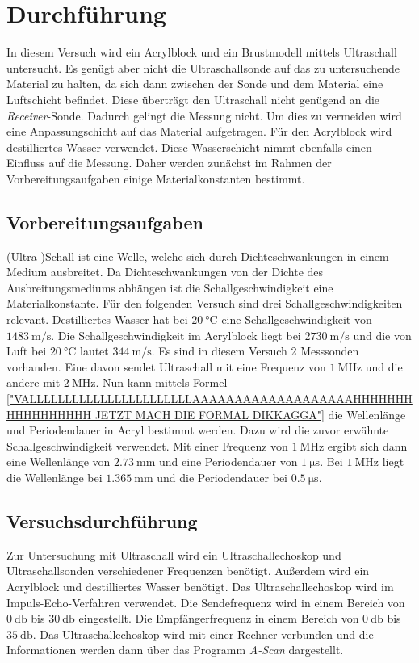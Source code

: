 \section{Durchführung}
\label{sec:Durchführung}
In diesem Versuch wird ein Acrylblock und ein Brustmodell mittels Ultraschall untersucht. Es genügt aber nicht die Ultraschallsonde auf das zu untersuchende Material zu halten, da sich dann
zwischen der Sonde und dem Material eine Luftschicht befindet. Diese überträgt den Ultraschall nicht genügend an die \textit{Receiver}-Sonde. Dadurch gelingt die Messung nicht. Um dies zu vermeiden
wird eine Anpassungschicht auf das Material aufgetragen. Für den Acrylblock wird destilliertes Wasser verwendet. Diese Wasserschicht nimmt ebenfalls einen Einfluss auf die Messung. Daher werden
zunächst im Rahmen der Vorbereitungsaufgaben einige Materialkonstanten bestimmt.
\subsection{Vorbereitungsaufgaben}
\label{subsec:VBA}
(Ultra-)Schall ist eine Welle, welche sich durch Dichteschwankungen in einem Medium ausbreitet. Da Dichteschwankungen von der Dichte des Ausbreitungsmediums abhängen ist die Schallgeschwindigkeit
eine  Materialkonstante. Für den folgenden Versuch sind drei Schallgeschwindigkeiten relevant. Destilliertes Wasser hat bei $\qty{20}{\celsius}$ eine Schallgeschwindigkeit von $\qty{1483}{\metre\per\second}$.
Die Schallgeschwindigkeit im Acrylblock liegt bei $\qty{2730}{\metre\per\second}$ und die von Luft bei $\qty{20}{\celsius}$ lautet $\qty{344}{\metre\per\second}$.
Es sind in diesem Versuch 2 Messsonden vorhanden. Eine davon sendet Ultraschall mit eine Frequenz von $\qty{1}{\mega\hertz}$ und die andere mit $\qty{2}{\mega\hertz}$. Nun kann mittels Formel
\eqref{"VALLLLLLLLLLLLLLLLLLLLLLLAAAAAAAAAAAAAAAAAAAHHHHHHHHHHHHHHHHH JETZT MACH DIE FORMAL DIKKAGGA"} die Wellenlänge und Periodendauer in Acryl bestimmt werden. Dazu wird die zuvor erwähnte Schallgeschwindigkeit
verwendet. Mit einer Frequenz von $\qty{1}{\mega\hertz}$ ergibt sich dann eine Wellenlänge von $\qty{2.73}{\milli\metre}$ und eine Periodendauer von $\qty{1}{\micro\second}$. Bei $\qty{1}{\mega\hertz}$
liegt die Wellenlänge bei $\qty{1.365}{\milli\metre}$ und die Periodendauer bei $\qty{0.5}{\micro\second}$.
\subsection{Versuchsdurchführung}
\label{subsec:Versuchsdurchführung}
Zur Untersuchung mit Ultraschall wird ein Ultraschallechoskop und Ultraschallsonden verschiedener Frequenzen benötigt. Außerdem wird ein Acrylblock und destilliertes Wasser benötigt. 
Das Ultraschallechoskop wird im Impuls-Echo-Verfahren verwendet. Die Sendefrequenz wird in einem Bereich von $\qty{0}{\decibel}$ bis $\qty{30}{\decibel}$ eingestellt. Die 
Empfängerfrequenz in einem Bereich von $\qty{0}{\decibel}$ bis $\qty{35}{\decibel}$. Das Ultraschallechoskop wird mit einer Rechner verbunden und die Informationen werden dann 
über das Programm \textit{A-Scan} dargestellt. 

